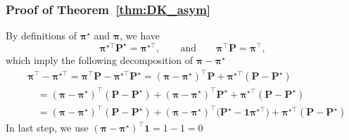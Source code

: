 \documentclass[compress,
mathserif,wide,%
]{beamer}
\begin{document}
\begin{frame}

	\frametitle{Proof of Theorem~\ref{thm:DK_asym}}
	By definitions of $\bm{\pi}^\star$ and $\bm{\pi}$, we have
	\[
\bm{\pi}^{\star\top}\bm{P}^{\star}=\bm{\pi}^{\star\top},\qquad\text{and}\qquad\bm{\pi}^{\top}\bm{P}=\bm{\pi}^{\top},
\]
%
which imply the following decomposition of $\bm{\pi}-\bm{\pi}^{\star}$
%
\begin{align*}
&\bm{\pi}^{\top}-\bm{\pi}^{\star\top}  =\bm{\pi}^{\top}\bm{P}-\bm{\pi}^{\star\top}\bm{P}^{\star}=\left(\bm{\pi}-\bm{\pi}^{\star}\right)^{\top}\bm{P}+\bm{\pi}^{\star\top}\left(\bm{P}-\bm{P}^{\star}\right)\\
 &\quad =\left(\bm{\pi}-\bm{\pi}^{\star}\right)^{\top}\left(\bm{P}-\bm{P}^{\star}\right)+\left(\bm{\pi}-\bm{\pi}^{\star}\right)^{\top}\bm{P}^{\star}+\bm{\pi}^{\star\top}\left(\bm{P}-\bm{P}^{\star}\right)\\
 &\quad =\left(\bm{\pi}-\bm{\pi}^{\star}\right)^{\top}\left(\bm{P}-\bm{P}^{\star}\right)
	+\left(\bm{\pi}-\bm{\pi}^{\star}\right)^{\top}\big(\bm{P}^{\star}-\bm{1}\bm{\pi}^{\star\top}\big) + \bm{\pi}^{\star\top}\left(\bm{P}-\bm{P}^{\star}\right)
\end{align*}
%
In last step, we use $\left(\bm{\pi}-\bm{\pi}^{\star}\right)^{\top}\bm{1}= 1 - 1 = 0$
\end{frame}
\end{document}
